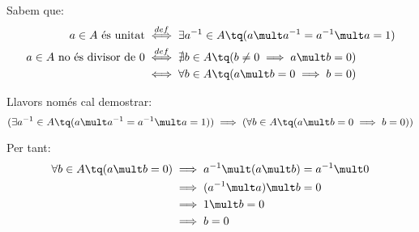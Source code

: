 Sabem que:
\[\begin{aligned}
	a \in A \text{ és unitat}		& \overset{def}{\iff} \exists a^{-1} \in A \tq (a \mult a^{-1} = a^{-1} \mult a = 1) \\
	a \in A \text{ no és divisor de 0}	& \overset{def}{\iff} \nexists b \in A \tq (b \neq 0 \implies a \mult b = 0) \\
						& \iff \forall b \in A \tq (a \mult b = 0 \implies b = 0)
\end{aligned}\]

Llavors només cal demostrar:
\[(\exists a^{-1} \in A \tq (a \mult a^{-1} = a^{-1} \mult a = 1)) \implies (\forall b \in A \tq (a \mult b = 0 \implies b = 0))\]

Per tant:
\[\begin{aligned}
	\forall b \in A \tq (a \mult b = 0)	& \implies a^{-1} \mult (a \mult b) = a^{-1} \mult 0 \\
						& \implies (a^{-1} \mult a) \mult b = 0 \\
						& \implies 1 \mult b = 0 \\
						& \implies b = 0
\end{aligned}\]
